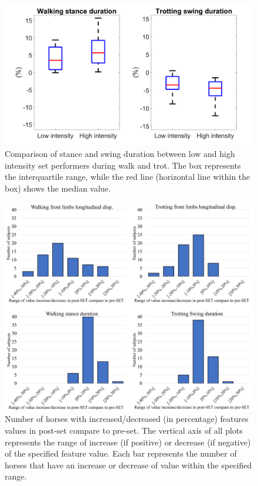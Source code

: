 \begin{figure}[!htbp]
\centering
\includegraphics[scale=0.06]{chapters/prepost/figures/stride_pp_HQ.png}
\caption{Comparison of stance and swing duration between low and high intensity \gls{set} performers during walk and trot. The box represents the interquartile range, while the red line (horizontal line within the box) shows the median value.}
\label{prepoststride}
\end{figure}

\begin{figure}[!htbp]
\centering
\includegraphics[width=.95\linewidth]{chapters/prepost/figures/ind_walktrot_HQ.png}
\caption{Number of horses with increased/decreased (in percentage) features values in post-\gls{set} compare to pre-\gls{set}. The vertical axis of all plots represents the range of increase (if positive) or decrease (if negative) of the specified feature value. Each bar represents the number of horses that have an increase or decrease of value within the specified range.}
\label{ind_walktrot}
\end{figure}



